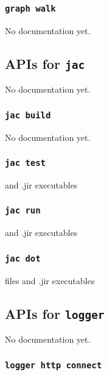 \subsubsection{\lstinline[basicstyle=\Large\ttfamily]$graph walk$}

{No documentation yet.}
\subsection{APIs for \lstinline[basicstyle=\Large\ttfamily]$jac$}

No documentation yet.

\subsubsection{\lstinline[basicstyle=\Large\ttfamily]$jac build$}

{No documentation yet.}
\subsubsection{\lstinline[basicstyle=\Large\ttfamily]$jac test$}

{and .jir executables}
\subsubsection{\lstinline[basicstyle=\Large\ttfamily]$jac run$}

{and .jir executables}
\subsubsection{\lstinline[basicstyle=\Large\ttfamily]$jac dot$}

{files and .jir executables}
\subsection{APIs for \lstinline[basicstyle=\Large\ttfamily]$logger$}

No documentation yet.

\subsubsection{\lstinline[basicstyle=\Large\ttfamily]$logger http connect$}

